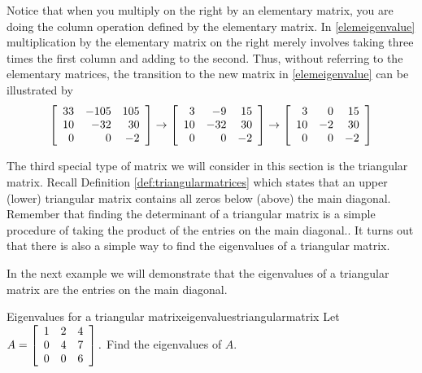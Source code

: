 Notice that when you multiply on the right by an elementary matrix,
you are doing the column operation defined by the elementary
matrix. In \ref{elemeigenvalue} multiplication by the elementary matrix on
the right merely involves taking three times the first column and
adding to the second. Thus, without referring to the elementary
matrices, the transition to the new matrix in \ref{elemeigenvalue} can be
illustrated by
\begin{equation*}
\left[
\begin{array}{rrr}
33 & -105 & 105 \\
10 & -32 & 30 \\
0 & 0 & -2
\end{array}
\right] \rightarrow \left[
\begin{array}{rrr}
3 & -9 & 15 \\
10 & -32 & 30 \\
0 & 0 & -2
\end{array}
\right] \rightarrow \left[
\begin{array}{rrr}
3 & 0 & 15 \\
10 & -2 & 30 \\
0 & 0 & -2
\end{array}
\right]
\end{equation*}

The third special type of matrix we will consider in this section is
the triangular matrix.  Recall Definition \ref{def:triangularmatrices}
which states that an upper (lower) triangular matrix contains all
zeros below (above) the main diagonal. Remember that finding the
determinant of a triangular matrix is a simple procedure of taking the product of the entries on the main diagonal.. It turns out
that there is also a simple way to find the eigenvalues of a
triangular matrix.

In the next example we will demonstrate that the eigenvalues of a 
triangular matrix are the entries on the main diagonal. 

\begin{example}{Eigenvalues for a triangular matrix}{eigenvaluestriangularmatrix}
Let $A=\left[
\begin{array}{rrr}
1 & 2 & 4 \\
0 & 4 & 7 \\
0 & 0 & 6
\end{array}
\right] .$ Find the eigenvalues of $A$.
\end{example}

